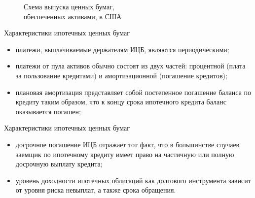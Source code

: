 \documentclass[_Banking_p2.tex]{subfiles}
\begin{document}
\begin{frame}[shrink=20]
\begin{figure}
	\center
	\begin{overprint}
	\end{overprint}
	\vspace*{-1.5em}
	\caption{Схема выпуска ценных бумаг,\\ обеспеченных активами, в США}
\end{figure}





\end{frame}

\begin{frame}{Характеристики ипотечных ценных бумаг}
\begin{itemize}[<	+->]
\item
платежи, выплачиваемые держателям ИЦБ, являются периодическими;

\item
платежи от пула активов обычно состоят из двух частей: процентной (плата за пользование кредитами) и амортизационной (погашение кредитов); 

\item
плановая амортизация представляет собой постепенное погашение баланса по кредиту таким образом, что к концу срока ипотечного кредита баланс оказывается погашен;
\end{itemize}
\end{frame}

\begin{frame}{Характеристики ипотечных ценных бумаг}
\begin{itemize}[<+->]
\item
досрочное погашение ИЦБ отражает тот факт, что в большинстве случаев заемщик по ипотечному кредиту имеет право на частичную или полную досрочную выплату кредита;

\item
уровень доходности ипотечных облигаций как долгового инструмента зависит от уровня риска невыплат, а также срока обращения. 
\end{itemize}
\end{frame}
\end{document}
